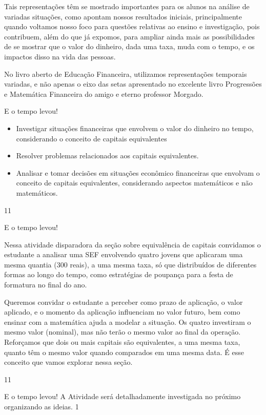 \begin{paginatexto}
Tais representações têm se mostrado importantes para os alunos na análise de variadas situações, como apontam nossos resultados iniciais, principalmente quando voltamos nosso foco para questões relativas ao ensino e investigação, pois contribuem, além do que já expomos, para ampliar ainda mais as possibilidades de se mostrar que o valor do dinheiro, dada uma taxa, muda com o tempo, e os impactos disso na vida das pessoas.

No livro aberto de Educação Financeira, utilizamos representações temporais variadas, e não apenas o eixo das setas apresentado no excelente livro Progressões e Matemática Financeira do amigo e eterno professor Morgado.
\end{paginatexto}
\clearpage

\def\currentcolor{session1}
\begin{objectives}{E o tempo levou!}
{
\begin{itemize}
\item Investigar situações financeiras que envolvem o valor do dinheiro no tempo, considerando o conceito de capitais equivalentes 
\item Resolver problemas relacionados aos capitais equivalentes.
\item Analisar e tomar decisões em situações econômico financeiras que envolvam o conceito de capitais equivalentes, considerando aspectos matemáticos e não matemáticos.
\end{itemize}
}{1}{1}
\end{objectives}
\begin{sugestions}{E o tempo levou!}
{
Nessa atividade disparadora da seção sobre equivalência de capitais convidamos o estudante a analisar uma SEF envolvendo quatro jovens que aplicaram uma mesma quantia (300 reais), a uma mesma taxa, só que distribuídos de diferentes formas ao longo do tempo, como estratégias de poupança para a festa de formatura no final do ano. 

Queremos convidar o estudante a perceber como prazo de aplicação, o valor aplicado, e o momento da aplicação influenciam no valor futuro, bem como ensinar com a matemática ajuda a modelar a situação. Os quatro investiram o mesmo valor (nominal), mas não terão o mesmo valor ao final da operação.
Reforçamos que dois ou mais capitais são equivalentes, a uma mesma taxa, quanto têm o mesmo valor quando comparados em uma mesma data. É esse conceito que vamos explorar nessa seção.

}{1}{1}
\end{sugestions}
\begin{answer}{E o tempo levou!}
{
A Atividade será detalhadamente investigada no próximo organizando as ideias.
}{1}
\end{answer}

